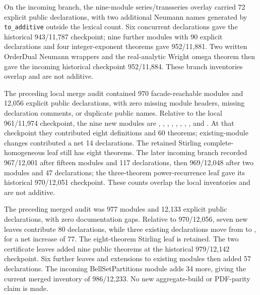 \documentclass[11pt,oneside]{article}
\theoremstyle{definition}
\theoremstyle{remark}
\begin{document}
On the incoming branch, the nine-module series/transseries overlay carried
72 explicit public declarations, with two additional Neumann names generated
by \nolinkurl{to_additive} outside the lexical count.  Six concurrent declarations
gave the historical 943/11,787 checkpoint; nine further modules with 90
explicit declarations and four integer-exponent theorems gave 952/11,881.
Two written OrderDual Neumann wrappers and the real-analytic Wright omega
theorem then gave the incoming historical checkpoint 952/11,884.
These branch inventories overlap and are not additive.

The preceding local merge audit contained 970 facade-reachable modules and
12,056 explicit public declarations, with zero missing module headers,
missing declaration comments, or duplicate public names.  Relative to the
local 961/11,974 checkpoint, the nine new modules are
, ,
, ,
, ,
,
, and
.  At that checkpoint they contributed eight definitions and
60 theorems; existing-module changes contributed a net 14 declarations.
The retained Stirling complete-homogeneous leaf still has eight theorems.
The later incoming branch recorded 967/12,001 after fifteen modules and
117 declarations, then 969/12,048 after two modules and 47 declarations;
the three-theorem power-recurrence leaf gave its historical 970/12,051
checkpoint.  These counts overlap the local inventories and are not additive.

The preceding merged audit was 977 modules and 12,133 explicit public
declarations, with zero documentation gaps.  Relative to 970/12,056, seven
new leaves contribute 80 declarations, while three existing declarations
move from  to ,
for a net increase of 77.  The eight-theorem Stirling leaf is retained.
The two certificate leaves added nine public theorems at the historical
979/12,142 checkpoint. Six further leaves and extensions to existing modules
then added 57 declarations. The incoming BellSetPartitions module adds 34
more, giving the current merged inventory of 986/12,233. No new aggregate-build
or PDF-parity claim is made.
\end{document}
